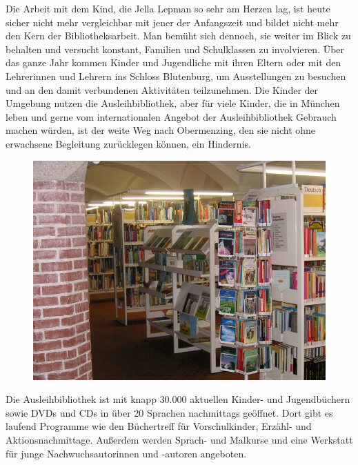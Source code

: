 \documentclass[a4paper,
fontsize=11pt,
oneside,
numbers=noperiodatend,
parskip=half-,
bibliography=totoc,
final
]{scrartcl}
\begin{document}
Die Arbeit mit dem Kind, die Jella Lepman so sehr am Herzen lag, ist
heute sicher nicht mehr vergleichbar mit jener der Anfangszeit und
bildet nicht mehr den Kern der Bibliotheksarbeit. Man bemüht sich
dennoch, sie weiter im Blick zu behalten und versucht konstant, Familien
und Schulklassen zu involvieren. Über das ganze Jahr kommen Kinder und
Jugendliche mit ihren Eltern oder mit den Lehrerinnen und Lehrern ins
Schloss Blutenburg, um Ausstellungen zu besuchen und an den damit
verbundenen Aktivitäten teilzunehmen. Die Kinder der Umgebung nutzen die
Ausleihbibliothek, aber für viele Kinder, die in München leben und gerne
vom internationalen Angebot der Ausleihbibliothek Gebrauch machen
würden, ist der weite Weg nach Obermenzing, den sie nicht ohne
erwachsene Begleitung zurücklegen können, ein Hindernis.~

\begin{figure}[htbp]
\centering
\includegraphics{img/bild18.jpg}
\end{figure}

Die Ausleihbibliothek ist mit knapp 30.000 aktuellen Kinder- und
Jugendbüchern sowie DVDs und CDs in über 20 Sprachen nachmittags
geöffnet. Dort gibt es laufend Programme wie den Büchertreff für
Vorschulkinder, Erzähl- und Aktionsnachmittage. Außerdem werden Sprach-
und Malkurse und eine Werkstatt für junge Nachwuchsautorinnen und
-autoren angeboten.
\end{document}
